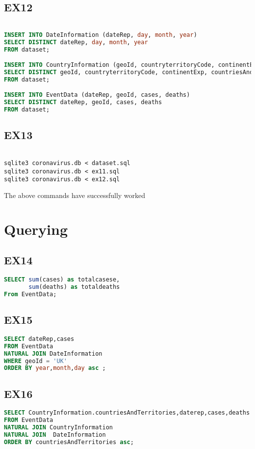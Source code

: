 \documentclass[10pt]{article}
\begin{document}
\subsection{EX12}
\begin{lstlisting}[language=SQL]

INSERT INTO DateInformation (dateRep, day, month, year)
SELECT DISTINCT dateRep, day, month, year
FROM dataset;

INSERT INTO CountryInformation (geoId, countryterritoryCode, continentExp, countriesAndTerritories, popData2020)
SELECT DISTINCT geoId, countryterritoryCode, continentExp, countriesAndTerritories, popData2020
FROM dataset;

INSERT INTO EventData (dateRep, geoId, cases, deaths)
SELECT DISTINCT dateRep, geoId, cases, deaths
FROM dataset;
\end{lstlisting}


\subsection{EX13} 
\begin{verbatim}

sqlite3 coronavirus.db < dataset.sql
sqlite3 coronavirus.db < ex11.sql
sqlite3 coronavirus.db < ex12.sql
\end{verbatim}
The above commands have successfully worked


\section{Querying}
\subsection{EX14}
\begin{lstlisting}[language=SQL]
SELECT sum(cases) as totalcasese,
       sum(deaths) as totaldeaths
From EventData;
\end{lstlisting}

\subsection{EX15}
\begin{lstlisting}[language=SQL]
SELECT dateRep,cases
FROM EventData
NATURAL JOIN DateInformation
WHERE geoId = 'UK'
ORDER BY year,month,day asc ;
\end{lstlisting}


\subsection{EX16}
\begin{lstlisting}[language=SQL]
SELECT CountryInformation.countriesAndTerritories,daterep,cases,deaths
FROM EventData
NATURAL JOIN CountryInformation
NATURAL JOIN  DateInformation
ORDER BY countriesAndTerritories asc;
\end{lstlisting}
\end{document}
